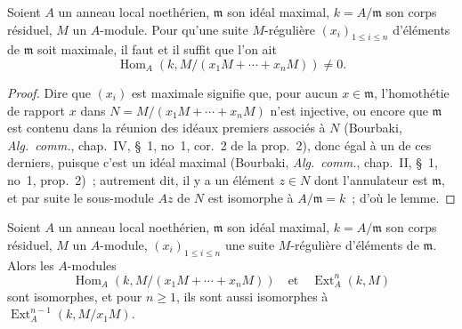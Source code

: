 \begin{lemma}[16.4.2]
\label{0.16.4.2-fr}
Soient $A$ un anneau local noethérien, $\mathfrak{m}$ son idéal maximal,
$k=A/\mathfrak{m}$ son corps résiduel, $M$ un $A$-module. Pour qu'une suite
$M$-régulière $(x_i)_{1\leq i\leq n}$ d'éléments de $\mathfrak{m}$ soit
maximale, il faut et il suffit que l'on ait
\[
  \operatorname{Hom}_A(k,M/(x_1M+\cdots+x_nM))\neq0.
\]
\end{lemma}

\begin{proof}
Dire que $(x_i)$ est maximale signifie que, pour aucun $x\in\mathfrak{m}$,
l'homothétie de rapport $x$ dans $N=M/(x_1M+\cdots+x_nM)$ n'est injective, ou
encore que $\mathfrak{m}$ est contenu dans la réunion des idéaux premiers
associés à $N$ (Bourbaki, \emph{Alg.~comm.}, chap.~IV, \S~1, no~1, cor.~2 de
la prop.~2), donc égal à un de ces derniers, puisque c'est un idéal
maximal (Bourbaki, \emph{Alg.~comm.}, chap.~II, \S~1, no~1, prop.~2)~;
autrement dit, il y a un élément $z\in N$ dont l'annulateur est
$\mathfrak{m}$, et par suite le sous-module $Az$ de $N$ est isomorphe à
$A/\mathfrak{m}=k$~; d'où le lemme.
\end{proof}

\begin{lemma}[16.4.3]
\label{0.16.4.3-fr}
Soient $A$ un anneau local noethérien, $\mathfrak{m}$ son idéal maximal,
$k=A/\mathfrak{m}$ son corps résiduel, $M$ un $A$-module,
$(x_i)_{1\leq i\leq n}$ une suite $M$-régulière d'éléments de
$\mathfrak{m}$. Alors les $A$-modules
\[
  \operatorname{Hom}_A(k,M/(x_1M+\cdots+x_nM))
  \quad\text{et}\quad \operatorname{Ext}^n_A(k,M)
\]
sont isomorphes, et pour $n\geq1$, ils sont aussi isomorphes à
$\operatorname{Ext}^{n-1}_A(k,M/x_1M)$.
\end{lemma}


